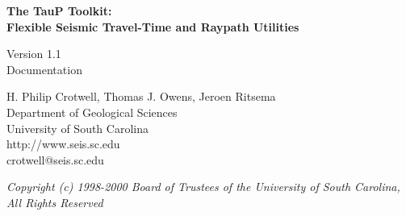 
\begin{titlepage}
\begin{center}

\vspace{2in}

\LARGE
\textbf{
The TauP Toolkit: \\
Flexible Seismic Travel-Time and Raypath Utilities \\
}

\large
Version 1.1 \\
Documentation 

\vspace{3in}

H. Philip Crotwell, Thomas J. Owens, Jeroen Ritsema \\
Department of Geological Sciences \\
University of South Carolina \\
http://www.seis.sc.edu \\
crotwell@seis.sc.edu 

\vspace{3in}

\textit{
\normalsize 
Copyright (c) 1998-2000 Board of Trustees of the University of South Carolina, \\
All Rights Reserved
\normalsize}

\end{center}
\end{titlepage}
